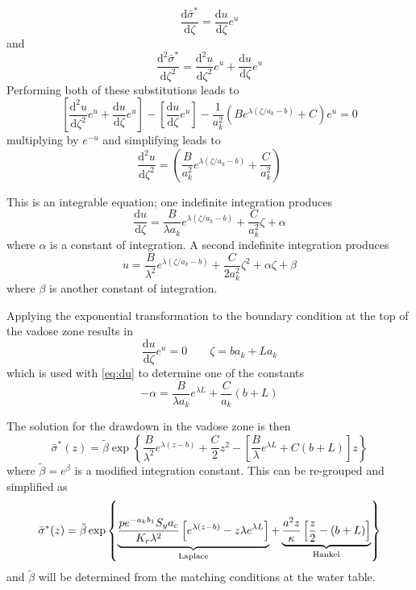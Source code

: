 \documentclass[11pt]{article}
\begin{document}
$$\frac{\mathrm{d}\bar{\sigma}^{\ast}}{\mathrm{d}\zeta} =
\frac{\mathrm{d}u}{\mathrm{d}\zeta}e^u$$ 
and
$$\frac{\mathrm{d}^2\bar{\sigma}^{\ast}}{\mathrm{d}\zeta^2} =
\frac{\mathrm{d}^2u}{\mathrm{d}\zeta^2}e^u +
\frac{\mathrm{d}u}{\mathrm{d}\zeta}e^u$$
Performing both of these substitutions leads to
$$ \left[ \frac{\mathrm{d}^2u}{\mathrm{d}\zeta^2}e^u +
  \frac{\mathrm{d}u}{\mathrm{d}\zeta}e^u \right]-  \left[
  \frac{\mathrm{d}u}{\mathrm{d}\zeta}e^u \right]- \frac{1}{a_k^2}\left( B e^{\lambda (\zeta/a_k-b)} + C\right) e^{u}=0$$
multiplying by $e^{-u}$ and simplifying leads to
\begin{equation}
  \label{eq:expsubODE}
   \frac{\mathrm{d}^2 u}{\mathrm{d}\zeta^2} = \left( \frac{B}{a_k^2} e^{\lambda (\zeta/a_k-b)} + \frac{C}{a_k^2}\right) 
\end{equation}

This is an integrable equation; one indefinite integration produces
\begin{equation}
  \label{eq:du}
  \frac{\mathrm{d} u}{\mathrm{d}\zeta} =  \frac{B}{\lambda a_k} e^{\lambda (\zeta/a_k-b)} + \frac{C}{a_k^2}\zeta + \alpha
\end{equation}
where $\alpha$ is a constant of integration. A second indefinite integration produces
$$ u =  \frac{B}{\lambda^2} e^{\lambda (\zeta/a_k-b)} + \frac{C}{2a_k^2}\zeta^2 + \alpha\zeta + \beta  $$
where $\beta$ is another constant of integration.  

Applying the exponential transformation to the boundary condition at the top of the vadose zone results in
$$\frac{\mathrm{d}u}{\mathrm{d}\zeta} e^u=0 \qquad \zeta=ba_k + La_k$$
which is used with \eqref{eq:du} to determine one of the constants
$$-\alpha= \frac{B}{\lambda a_k} e^{\lambda L} + \frac{C}{a_k} \left( b+L\right) $$

The solution for the drawdown in the vadose zone is then
\begin{equation}
  \nonumber
  \bar{\sigma}^{\ast} (z) = \tilde{\beta}\exp\left\{ \frac{B}{\lambda^2} e^{\lambda (z-b)} + \frac{C}{2}z^2 -\left[\frac{B}{\lambda} e^{\lambda L} + C \left( b+L\right)\right]z  \right\}
\end{equation}
where $\tilde{\beta}=e^\beta$ is a modified integration constant. This can be re-grouped and simplified as
\begin{equation}
  \label{eq:sigma}
  \bar{\sigma}^{\ast} (z) = \tilde{\beta}\exp\left\{  \underbrace{\frac{p e^{-a_k b_1} S_y a_c} {K_r \lambda^2} \left[ e^{\lambda (z-b)}  - z\lambda e^{\lambda L} \right]}_{\rm Laplace} + \underbrace{\frac{a^2 z}{\kappa}\left[\frac{z}{2} - \left( b+L\right) \right]}_{\rm Hankel}  \right\}
\end{equation}
and $\tilde{\beta}$ will be determined from the matching conditions at the water table.
\end{document}
